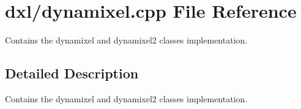 \hypertarget{a00012}{}\section{dxl/dynamixel.cpp File Reference}
\label{a00012}


Contains the dynamixel and dynamixel2 classes implementation.  




\subsection{Detailed Description}
Contains the dynamixel and dynamixel2 classes implementation. 

